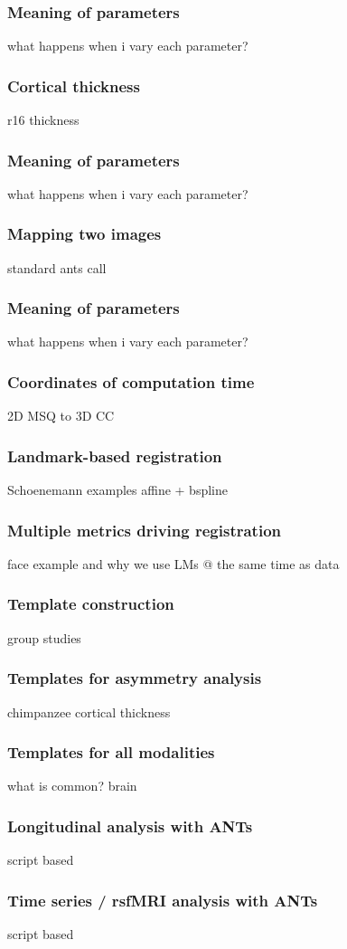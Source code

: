\documentclass[18pt]{beamer}
\begin{document}
\begin{frame}
\frametitle{Meaning of parameters}
what happens when i vary each parameter?
\end{frame}

\begin{frame}
\frametitle{Cortical thickness}
r16 thickness 
\end{frame}

\begin{frame}
\frametitle{Meaning of parameters}
what happens when i vary each parameter?
\end{frame}

\begin{frame}
\frametitle{Mapping two images}
standard ants call 
\end{frame}

\begin{frame}
\frametitle{Meaning of parameters}
what happens when i vary each parameter?
\end{frame}

\begin{frame}
\frametitle{Coordinates of computation time}
2D MSQ to 3D CC
\end{frame}

\begin{frame}
\frametitle{Landmark-based registration}
Schoenemann examples affine + bspline 
\end{frame}

\begin{frame}
\frametitle{Multiple metrics driving registration}
face example and why we use LMs @ the same time as data 
\end{frame}

\begin{frame}
\frametitle{Template construction}
group studies 
\end{frame}

\begin{frame}
\frametitle{Templates for asymmetry analysis}
chimpanzee cortical thickness 
\end{frame}

\begin{frame}
\frametitle{Templates for all modalities}
what is common?  brain
\end{frame}

\begin{frame}
\frametitle{Longitudinal analysis with ANTs}
script based 
\end{frame}

\begin{frame}
\frametitle{Time series / rsfMRI analysis with ANTs}
script based 
\end{frame}
\end{document}
